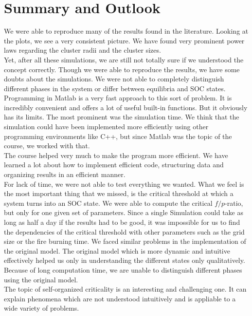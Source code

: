 \documentclass[11pt]{article}
\begin{document}
\section{Summary and Outlook}
We were able to reproduce many of the results found in the literature. Looking at the plots, we see a very consistent picture. We have found very prominent power laws regarding the cluster radii and the cluster sizes.\\ 
Yet, after all these simulations, we are still not totally sure if we understood the concept correctly. Though we were able to reproduce the results, we have some doubts about the simulations. We were not able to completely distinguish different phases in the system or differ between equilibria and SOC states. \\
Programming in Matlab is a very fast approach to this sort of problem. It is incredibly convenient and offers a lot of useful built-in functions. But it obviously has its limits. The most prominent was the simulation time. We think that the simulation could have been implemented more efficiently using other programming environments like C++, but since Matlab was the topic of the course, we worked with that. \\
The course helped very much to make the program more efficient. We have learned a lot about how to implement efficient code, structuring data and organizing results in an efficient manner. \\

For lack of time, we were not able to test everything we wanted. What we feel is the most important thing that we missed, is the critical threshold at which a system turns into an SOC state. We were able to compute the critical $f/p$-ratio, but only for one given set of parameters. Since a single Simulation could take as long as half a day if the results had to be good, it was impossible for us to find the dependencies of the critical threshold with other parameters such as the grid size or the fire burning time. We faced similar problems in the implementation of the original model. The original model which is more dynamic and intuitive effectively helped us only in understanding the different states only qualitatively. Because of long computation time, we are unable to distinguish different phases using the original model.\\

The topic of self-organized criticality is an interesting and challenging one. It can explain phenomena which are not understood intuitively and is appliable to a wide variety of problems. 
\end{document}
